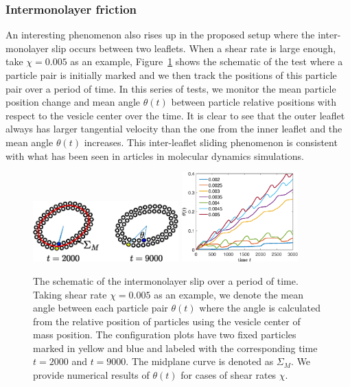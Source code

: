 \documentclass[lineno]{jfm}
\begin{document}
\subsubsection{Intermonolayer friction}
An interesting phenomenon also rises up in the proposed setup where the inter-monolayer slip occurs 
between two leaflets. When a shear rate is large enough, take $\chi = 0.005$ as an example, 
Figure~\ref{figure5} shows the schematic of the test where a particle pair is initially marked and we then track the positions of this particle pair over a period of time. 
In this series of tests, we monitor the mean particle position change and mean angle $\theta(t)$ between particle relative positions with respect to the vesicle center over the time. It is clear to see that the outer leaflet always has larger tangential velocity than the one from the inner leaflet and the mean angle $\theta(t)$ increases. This inter-leaflet sliding phenomenon is consistent with what has been seen
in articles in molecular dynamics simulations.

%


\begin{figure}
\begin{center}
\includegraphics[width=0.5\textwidth]{Slip.eps}
\includegraphics[width=0.4\textwidth]{Slip2.eps}
\end{center} 
  \caption{The schematic of the intermonolayer slip over a period of time. Taking shear rate $\chi=0.005$ as an example, we denote the mean angle between each particle pair $\theta(t)$ where the angle is calculated from the relative position of particles using the vesicle center of mass position. The configuration plots have two fixed particles marked in yellow and blue and labeled with the corresponding time $t=2000$ and $t=9000$. The midplane curve is denoted as $\Sigma_M$. We provide numerical results of $\theta(t)$ for cases of shear rates $\chi$.
  }
    \label{figure5}
\end{figure}
\end{document}
